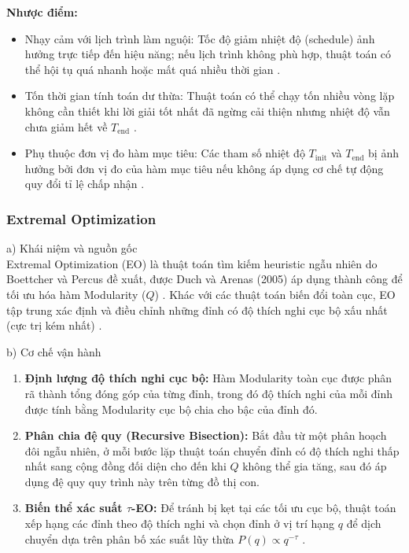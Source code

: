\documentclass[14pt,a4paper]{extarticle}
\begin{document}
\textbf{Nhược điểm:}
\begin{itemize}
    \item Nhạy cảm với lịch trình làm nguội: Tốc độ giảm nhiệt độ (schedule) ảnh hưởng trực tiếp đến hiệu năng; nếu lịch trình không phù hợp, thuật toán có thể hội tụ quá nhanh hoặc mất quá nhiều thời gian \cite{Luke2009}.
    \item Tốn thời gian tính toán dư thừa: Thuật toán có thể chạy tốn nhiều vòng lặp không cần thiết khi lời giải tốt nhất đã ngừng cải thiện nhưng nhiệt độ vẫn chưa giảm hết về $T_{\text{end}}$ \cite{Taillard2023}.
    \item Phụ thuộc đơn vị đo hàm mục tiêu: Các tham số nhiệt độ $T_{\text{init}}$ và $T_{\text{end}}$ bị ảnh hưởng bởi đơn vị đo của hàm mục tiêu nếu không áp dụng cơ chế tự động quy đổi tỉ lệ chấp nhận \cite{Taillard2023}.
\end{itemize}

\subsubsection{Extremal Optimization}
\noindent a) Khái niệm và nguồn gốc
\\
Extremal Optimization (EO) là thuật toán tìm kiếm heuristic ngẫu nhiên do Boettcher và Percus đề xuất, được Duch và Arenas (2005) áp dụng thành công để tối ưu hóa hàm Modularity ($Q$) \cite{Fortunato2010, Beldi2025}. Khác với các thuật toán biến đổi toàn cục, EO tập trung xác định và điều chỉnh những đỉnh có độ thích nghi cục bộ xấu nhất (cực trị kém nhất) \cite{Fortunato2010}.

\noindent b) Cơ chế vận hành
\\ 
\begin{enumerate}
    \item \textbf{Định lượng độ thích nghi cục bộ:} Hàm Modularity toàn cục được phân rã thành tổng đóng góp của từng đỉnh, trong đó độ thích nghi của mỗi đỉnh được tính bằng Modularity cục bộ chia cho bậc của đỉnh đó.
    \item \textbf{Phân chia đệ quy (Recursive Bisection):} Bắt đầu từ một phân hoạch đôi ngẫu nhiên, ở mỗi bước lặp thuật toán chuyển đỉnh có độ thích nghi thấp nhất sang cộng đồng đối diện cho đến khi $Q$ không thể gia tăng, sau đó áp dụng đệ quy quy trình này trên từng đồ thị con.
    \item \textbf{Biến thể xác suất $\tau$-EO:} Để tránh bị kẹt tại các tối ưu cục bộ, thuật toán xếp hạng các đỉnh theo độ thích nghi và chọn đỉnh ở vị trí hạng $q$ để dịch chuyển dựa trên phân bố xác suất lũy thừa $P(q) \propto q^{-\tau}$ \cite{Fortunato2010}.
\end{enumerate}
\end{document}
